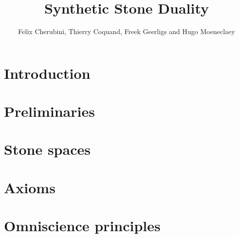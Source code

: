 \documentclass{../util/zariski}
\title{Synthetic Stone Duality}
\begin{document}
\author{Felix Cherubini, Thierry Coquand, Freek Geerligs and Hugo Moeneclaey}

\maketitle

%

\tableofcontents

\section*{Introduction}


\section{Preliminaries}


\section{Stone spaces}


\section{Axioms}


\section{Omniscience principles}

\end{document}
